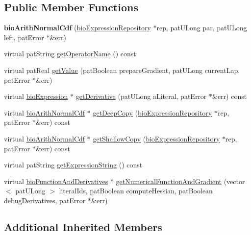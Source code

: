 \subsection*{Public Member Functions}
\begin{DoxyCompactItemize}
\item 
\mbox{\label{classbio_arith_normal_cdf_a307bf9c59169fcd089379f7c5cd14226}} 
{\bfseries bio\+Arith\+Normal\+Cdf} (\hyperlink{classbio_expression_repository}{bio\+Expression\+Repository} $\ast$rep, pat\+U\+Long par, pat\+U\+Long left, pat\+Error $\ast$\&err)
\item 
virtual pat\+String \hyperlink{classbio_arith_normal_cdf_a5c5a2ee63e4df2a8ccbc117bf819e48b}{get\+Operator\+Name} () const
\item 
virtual pat\+Real \hyperlink{classbio_arith_normal_cdf_abf66a564a8a244d62205d19484b63315}{get\+Value} (pat\+Boolean prepare\+Gradient, pat\+U\+Long current\+Lap, pat\+Error $\ast$\&err)
\item 
virtual \hyperlink{classbio_expression}{bio\+Expression} $\ast$ \hyperlink{classbio_arith_normal_cdf_adf643b1adb105be0728b921cd96d555f}{get\+Derivative} (pat\+U\+Long a\+Literal, pat\+Error $\ast$\&err) const
\item 
virtual \hyperlink{classbio_arith_normal_cdf}{bio\+Arith\+Normal\+Cdf} $\ast$ \hyperlink{classbio_arith_normal_cdf_ae88a5f7d19f32cc5daf01152931e9c62}{get\+Deep\+Copy} (\hyperlink{classbio_expression_repository}{bio\+Expression\+Repository} $\ast$rep, pat\+Error $\ast$\&err) const
\item 
virtual \hyperlink{classbio_arith_normal_cdf}{bio\+Arith\+Normal\+Cdf} $\ast$ \hyperlink{classbio_arith_normal_cdf_af05c8a2c466ed42e1f4b517b35b4be11}{get\+Shallow\+Copy} (\hyperlink{classbio_expression_repository}{bio\+Expression\+Repository} $\ast$rep, pat\+Error $\ast$\&err) const
\item 
virtual pat\+String \hyperlink{classbio_arith_normal_cdf_a2e5b58ae0d8b71d2129e7f44ff9c647e}{get\+Expression\+String} () const
\item 
virtual \hyperlink{classbio_function_and_derivatives}{bio\+Function\+And\+Derivatives} $\ast$ \hyperlink{classbio_arith_normal_cdf_ac482f8e85421635fd033018fd779ef88}{get\+Numerical\+Function\+And\+Gradient} (vector$<$ pat\+U\+Long $>$ literal\+Ids, pat\+Boolean compute\+Hessian, pat\+Boolean debug\+Derivatives, pat\+Error $\ast$\&err)
\end{DoxyCompactItemize}
\subsection*{Additional Inherited Members}


